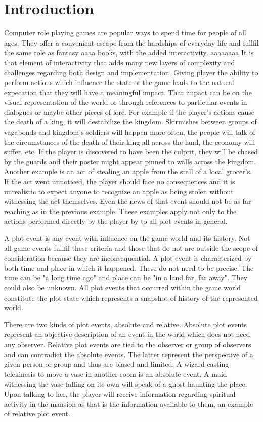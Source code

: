 
\chapter*{Introduction}

Computer role playing games are popular ways to spend time for people of all ages.
They offer a convenient escape from the hardships of everyday life and fullfil the same role as fantasy aaaa books, with the added interactivity. aaaaaaaa
It is that element of interactivity that adds many new layers of complexity and challenges regarding both design and implementation.
Giving player the ability to perform actions which influence the state of the game leads to the natural expecation that they will have a meaningful impact.
That impact can be on the visual representation of the world or through references to particular events in dialogues or maybe other pieces of lore.
For example if the player's actions cause the death of a king, it will destabilize the kingdom.
Skirmishes between groups of vagabonds and kingdom's soldiers will happen more often, the people will talk of the circumstances of the death of their king all across the land, the economy will suffer, etc.
If the player is discovered to have been the culprit, they will be chased by the guards and their poster might appear pinned to walls across the kingdom.
Another example is an act of stealing an apple from the stall of a local grocer's.
If the act went unnoticed, the player should face no consequences and it is unrealistic to expect anyone to recognize an apple as being stolen without witnessing the act themselves.
Even the news of that event should not be as far-reaching as in the previous example.
These examples apply not only to the actions performed directly by the player by to all plot events in general.

A plot event is any event with influence on the game world and its history.
Not all game events fullfil these criteria and those that do not are outside the scope of consideration because they are inconsequential.
A plot event is characterized by both time and place in which it happened.
These do not need to be precise.
The time can be "a long time ago" and place can be "in a land far, far away".
They could also be unknown.
All plot events that occurred within the game world constitute the plot state which represents a snapshot of history of the represented world.

There are two kinds of plot events, absolute and relative.
Absolute plot events represent an objective description of an event in the world which does not need any observer.
Relative plot events are tied to the observer or group of observers and can contradict the absolute events.
The latter represent the perspective of a given person or group and thus are biased and limited.
A wizard casting telekinesis to move a vase in another room is an absolute event.
A maid witnessing the vase falling on its own will speak of a ghost haunting the place.
Upon talking to her, the player will receive information regarding spiritual activity in the mansion as that is the information available to them, an example of relative plot event.

